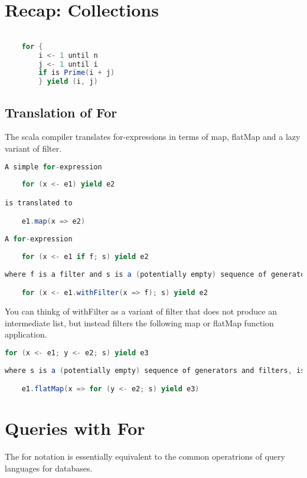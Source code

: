 \documentclass[10pt, a4paper]{report}
\begin{document}
\section{Recap: Collections}

\begin{lstlisting}[language=scala]

	for {
		i <- 1 until n
		j <- 1 until i
		if is Prime(i + j)
		} yield (i, j)

\end{lstlisting}

\subsection{Translation of For}
The scala compiler translates for-expressions in terms of map, flatMap and a lazy variant of filter.

\begin{lstlisting}[language=scala]
A simple for-expression
	
	for (x <- e1) yield e2

is translated to

	e1.map(x => e2)
	
A for-expression
	
	for (x <- e1 if f; s) yield e2
	
where f is a filter and s is a (potentially empty) sequence of generators and filters, is translated to

	for (x <- e1.withFilter(x => f); s) yield e2

\end{lstlisting}

You can thinkg of withFilter as a variant of filter that does not produce an intermediate list, but instead filters the following map or flatMap function application.

\begin{lstlisting}[language=scala]
	for (x <- e1; y <- e2; s) yield e3
	
where s is a (potentially empty) sequence of generators and filters, is translated into

	e1.flatMap(x => for (y <- e2; s) yield e3)

\end{lstlisting}

\section{Queries with For}
The for notation is essentially equivalent to the common operatrions of query languages for databases.
\end{document}
